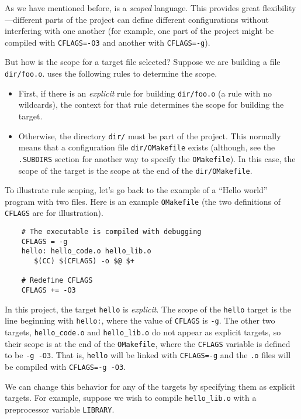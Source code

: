 As we have mentioned before,  is a \emph{scoped} language.  This provides great
flexibility---different parts of the project can define different configurations without interfering
with one another (for example, one part of the project might be compiled with \verb+CFLAGS=-O3+ and
another with \verb+CFLAGS=-g+).

But how is the scope for a target file selected?  Suppose we are building a file \verb+dir/foo.o+.
 uses the following rules to determine the scope.

\begin{itemize}
\item First, if there is an \emph{explicit} rule for building \verb+dir/foo.o+ (a rule with no
wildcards), the context for that rule determines the scope for building the target.
\item Otherwise, the directory \verb+dir/+ must be part of the project.  This normally means that a
configuration file \verb+dir/OMakefile+ exists (although, see the \verb+.SUBDIRS+ section for
another way to specify the \verb+OMakefile+).  In this case, the scope of the target is the scope at
the end of the \verb+dir/OMakefile+.
\end{itemize}

To illustrate rule scoping, let's go back to the example of a ``Hello world'' program with two
files.  Here is an example \verb+OMakefile+ (the two definitions of \verb+CFLAGS+ are for
illustration).

\begin{verbatim}
    # The executable is compiled with debugging
    CFLAGS = -g
    hello: hello_code.o hello_lib.o
       $(CC) $(CFLAGS) -o $@ $+

    # Redefine CFLAGS
    CFLAGS += -O3
\end{verbatim}

In this project, the target \verb+hello+ is \emph{explicit}.  The scope of the \verb+hello+ target
is the line beginning with \verb+hello:+, where the value of \verb+CFLAGS+ is \verb+-g+.  The other
two targets, \verb+hello_code.o+ and \verb+hello_lib.o+ do not appear as explicit targets, so their
scope is at the end of the \verb+OMakefile+, where the \verb+CFLAGS+ variable is defined to be
\verb+-g -O3+.  That is, \verb+hello+ will be linked with \verb+CFLAGS=-g+ and the \verb+.o+ files
will be compiled with \verb+CFLAGS=-g -O3+.

We can change this behavior for any of the targets by specifying them as explicit targets.  For
example, suppose we wish to compile \verb+hello_lib.o+ with a preprocessor variable \verb+LIBRARY+.

